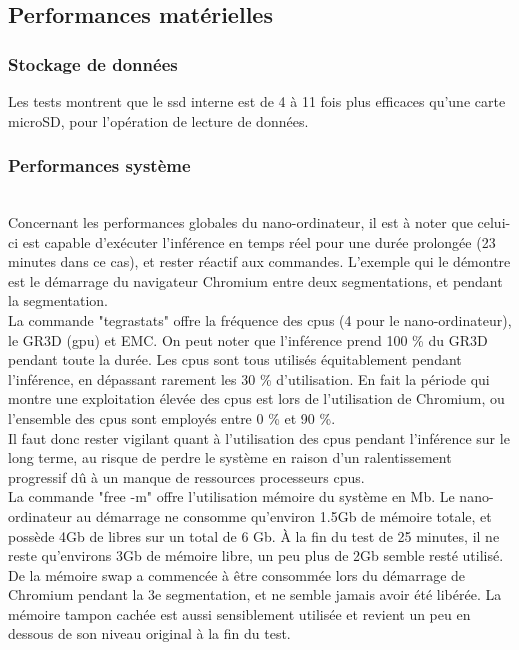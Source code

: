 ﻿\subsection{Performances matérielles}
\subsubsection{Stockage de données}
\noindent Les tests montrent que le \acrshort{ssd} interne est de 4 à 11 fois plus efficaces qu'une carte microSD, pour l'opération de lecture de données. 
\subsubsection{Performances système}
\vspace{0.5\baselineskip}
\\
\noindent Concernant les performances globales du nano-ordinateur, il est à noter que celui-ci est capable d'exécuter l'inférence en temps réel pour une durée prolongée (23 minutes dans ce cas), et rester réactif aux commandes. L'exemple qui le démontre est le démarrage du navigateur Chromium entre deux segmentations, et pendant la segmentation.
\vspace{0.5\baselineskip}
\\
\noindent La commande "tegrastats" offre la fréquence des \acrshort{cpu}s (4 pour le nano-ordinateur), le GR3D (\acrshort{gpu}) et EMC. On peut noter que l'inférence prend 100 \% du GR3D pendant toute la durée. Les \acrshort{cpu}s sont tous utilisés équitablement pendant l'inférence, en dépassant rarement les 30 \% d'utilisation. En fait la période qui montre une exploitation élevée des \acrshort{cpu}s est lors de l'utilisation de Chromium, ou l'ensemble des \acrshort{cpu}s sont employés entre 0 \% et 90 \%. 
\vspace{0.5\baselineskip}
\\
\noindent Il faut donc rester vigilant quant à l'utilisation des \acrshort{cpu}s pendant l'inférence sur le long terme, au risque de perdre le système en raison d'un ralentissement progressif dû à un manque de ressources processeurs \acrshort{cpu}s.
\vspace{0.5\baselineskip}
\\
\noindent La commande "free -m" offre l'utilisation mémoire du système en Mb. Le nano-ordinateur au démarrage ne consomme qu'environ 1.5Gb de mémoire totale, et possède 4Gb de libres sur un total de 6 Gb. À la fin du test de 25 minutes, il ne reste qu'environs 3Gb de mémoire libre, un peu plus de 2Gb semble resté utilisé. De la mémoire swap a commencée à être consommée lors du démarrage de Chromium pendant la 3e segmentation, et ne semble jamais avoir été libérée. La mémoire tampon cachée est aussi sensiblement utilisée et revient un peu en dessous de son niveau original à la fin du test. 
